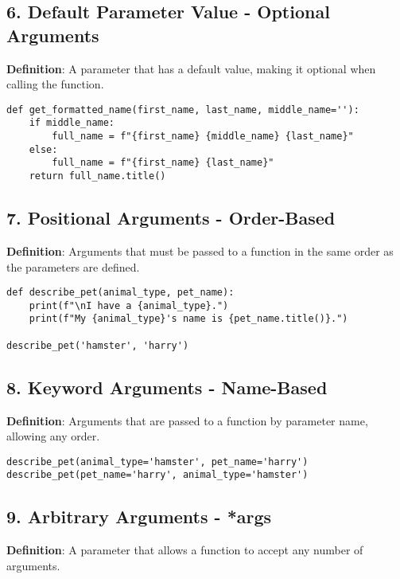 

\subsection*{6. Default Parameter Value - Optional Arguments}
\textbf{Definition}: A parameter that has a default value, making it optional when calling the function.

\begin{lstlisting}
def get_formatted_name(first_name, last_name, middle_name=''):
    if middle_name:
        full_name = f"{first_name} {middle_name} {last_name}"
    else:
        full_name = f"{first_name} {last_name}"
    return full_name.title()
\end{lstlisting}

\subsection*{7. Positional Arguments - Order-Based}
\textbf{Definition}: Arguments that must be passed to a function in the same order as the parameters are defined.

\begin{lstlisting}
def describe_pet(animal_type, pet_name):
    print(f"\nI have a {animal_type}.")
    print(f"My {animal_type}'s name is {pet_name.title()}.")

describe_pet('hamster', 'harry')
\end{lstlisting}

\subsection*{8. Keyword Arguments - Name-Based}
\textbf{Definition}: Arguments that are passed to a function by parameter name, allowing any order.

\begin{lstlisting}
describe_pet(animal_type='hamster', pet_name='harry')
describe_pet(pet_name='harry', animal_type='hamster')
\end{lstlisting}

\subsection*{9. Arbitrary Arguments - *args}
\textbf{Definition}: A parameter that allows a function to accept any number of arguments.



